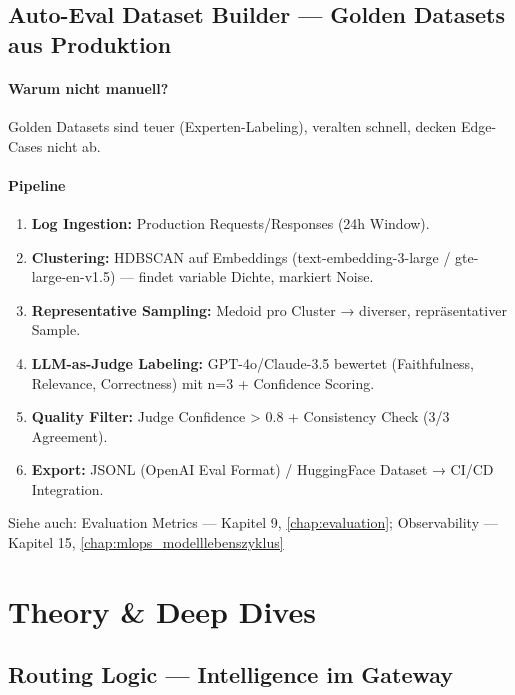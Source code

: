 
\subsection{Auto-Eval Dataset Builder — Golden Datasets aus Produktion}

\paragraph{Warum nicht manuell?} Golden Datasets sind teuer (Experten-Labeling), veralten schnell, decken Edge-Cases nicht ab.

\paragraph{Pipeline}
\begin{enumerate}
    \item \textbf{Log Ingestion:} Production Requests/Responses (24h Window).
    \item \textbf{Clustering:} HDBSCAN auf Embeddings (text-embedding-3-large / gte-large-en-v1.5) — findet variable Dichte, markiert Noise.
    \item \textbf{Representative Sampling:} Medoid pro Cluster → diverser, repräsentativer Sample.
    \item \textbf{LLM-as-Judge Labeling:} GPT-4o/Claude-3.5 bewertet (Faithfulness, Relevance, Correctness) mit n=3 + Confidence Scoring.
    \item \textbf{Quality Filter:} Judge Confidence > 0.8 + Consistency Check (3/3 Agreement).
    \item \textbf{Export:} JSONL (OpenAI Eval Format) / HuggingFace Dataset → CI/CD Integration.
\end{enumerate}

Siehe auch: Evaluation Metrics — Kapitel 9, \ref{chap:evaluation}; Observability — Kapitel 15, \ref{chap:mlops_modelllebenszyklus}

\section{Theory \& Deep Dives}

\subsection{Routing Logic — Intelligence im Gateway}

